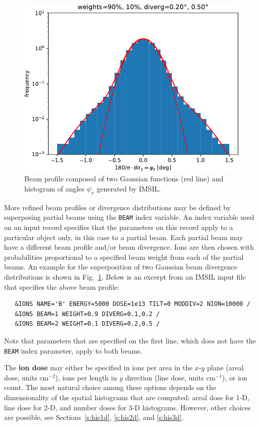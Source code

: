 \begin{figure}[htbp]
\centering
\noindent\includegraphics[scale=0.8]{diverg_y-crop.pdf}
\caption{Beam profile composed of two Gaussian functions (red line) and
histogram of angles \(\psi_\mathrm{y}\) generated by IMSIL.}
\label{fig:diverg}
\end{figure}  
%
More refined beam profiles or divergence distributions may be defined by
superposing partial beams using the \texttt{BEAM} index variable. An index
variable used on an input record specifies that the parameters on this record
apply to a particular object only, in this case to a partial beam. Each partial
beam may have a different beam profile and/or beam divergence. Ions are then
chosen with probabilities proportional to a specified beam weight from each of
the partial beams. An example for the superposition of two Gaussian beam
divergence distributions is shown in Fig.~\ref{fig:diverg}. Below is an excerpt
from an IMSIL input file that specifies the above beam profile: 
%
\begin{verbatim}
   &IONS NAME='B' ENERGY=5000 DOSE=1e13 TILT=0 MODDIV=2 NION=10000 /
   &IONS BEAM=1 WEIGHT=0.9 DIVERG=0.1,0.2 /
   &IONS BEAM=2 WEIGHT=0.1 DIVERG=0.2,0.5 /
\end{verbatim}
%
Note that parameters that are specified on the first line, which does not have
the \texttt{BEAM} index parameter, apply to both beams.

The \textbf{ion dose} may either be specified in ions per area in the $x$-$y$
plane (areal dose, units cm$^{-2}$), ions per length in $y$ direction (line
dose, units cm$^{-1}$), or ion count. The most natural choice among these
options depends on the dimensionality of the spatial histograms that are
computed: areal dose for 1-D, line dose for 2-D, and number doses for 3-D
histograms. However, other choices are possible, see Sections~\ref{s:his1d},
\ref{s:his2d}, and \ref{s:his3d}.

